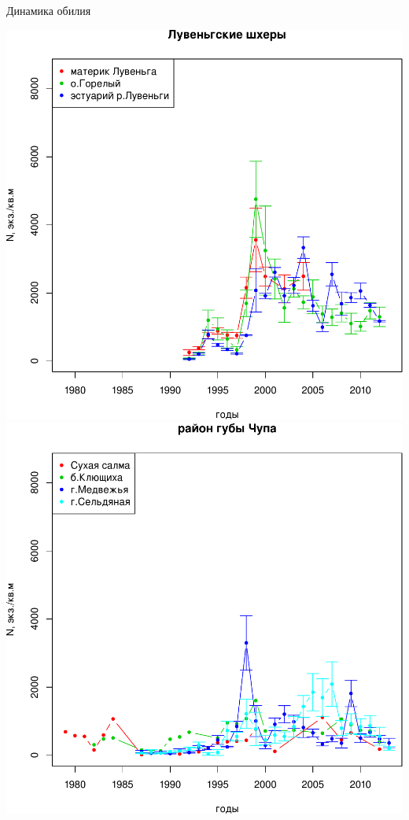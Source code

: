 \documentclass{beamer}
\begin{document}
\begin{frame}{Динамика обилия}
	\begin{minipage}[t]{.45\linewidth}
\begin{center}
			\includegraphics[height=.45\textheight]{N2_dynamic_Luvenga_all.pdf}\\
			\includegraphics[height=.45\textheight]{N2_dynamic_Chupa_all.pdf}

\end{center}
\end{minipage}
\end{frame}
\end{document}
